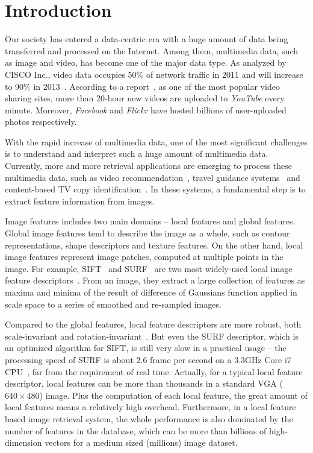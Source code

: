 \section{Introduction}
\label{sec:introduction}

Our society has entered a data-centric era with a huge amount of data being transferred and processed on the Internet. Among them, multimedia data, such as image and video, has become one of the major data type. As analyzed by CISCO Inc., video data occupies 50\% of network traffic in 2011 and will increase to 90\% in 2013~\cite{index2010forecast}.  According to a report~\cite{jansohn2009detecting}, as one of the most popular video sharing sites, more than 20-hour new videos are uploaded to \emph{YouTube} every minute. Moreover, \emph{Facebook} and \emph{Flickr} have hosted billions of user-uploaded photos respectively.

With the rapid increase of multimedia data, one of the most significant challenges is to understand and interpret such a huge amount of multimedia data. Currently, more and more retrieval applications are emerging to process these multimedia data, such as video recommendation~\cite{videorecommendation2007}, travel guidance systems~\cite{travelguidance2010} and content-based TV copy identification~\cite{tvidentify2003}. In these systems, a fundamental step is to extract feature information from images. 

Image features includes two main domains -- local features and global features. Global image features tend to describe the image as a whole, such as contour representations, shape descriptors and texture features. On the other hand, local image features represent image patches, computed at multiple points in the image. For example, SIFT~\cite{Lowe2004SIFT,RobHess} and SURF~\cite{Bay2006SURF,Evans20009OpenSURF} are two most widely-used local image feature descriptors~\cite{Mikolajczyk2005Evaluation}\cite{Bauer2007Evaluation}. From an image, they extract a large collection of features as maxima and minima of the result of difference of Gaussians function applied in scale space to a series of smoothed and re-sampled images.

Compared to the global features, local feature descriptors are more robust, both scale-invariant and rotation-invariant~\cite{mikolajczyk2005performance}\cite{Bauer2007Evaluation}. But even the SURF descriptor, which is an optimized algorithm for SIFT, is still very slow in a practical usage -- the processing speed of SURF is about 2.6 frame per second on a 3.3GHz Core i7 CPU~\cite{Fang2011ispass}, far from the requirement of real time. Actually, for a typical local feature descriptor, local features can be more than thousands in a standard VGA ($640\times480$) image. Plus the computation of each local feature, the great amount of local features means a relatively high overhead. Furthermore, in a local feature based image retrieval system, the whole performance is also dominated by the number of features in the database, which can be more than billions of high-dimension vectors for a medium sized (millions) image dataset.

